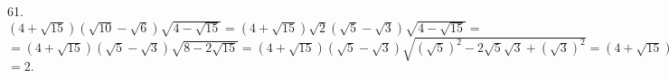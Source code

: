61. $(4+\sqrt{15})(\sqrt{10}-\sqrt{6})\sqrt{4-\sqrt{15}}=(4+\sqrt{15})\sqrt{2}(\sqrt{5}-\sqrt{3})\sqrt{4-\sqrt{15}}=$\\$=
(4+\sqrt{15})(\sqrt{5}-\sqrt{3})\sqrt{8-2\sqrt{15}}=(4+\sqrt{15})(\sqrt{5}-\sqrt{3})\sqrt{(\sqrt{5})^2-2\sqrt{5}\sqrt{3}+(\sqrt{3})^2}=
(4+\sqrt{15})(\sqrt{5}-\sqrt{3})\sqrt{(\sqrt{5}-\sqrt{3})^2}=(4+\sqrt{15})(\sqrt{5}-\sqrt{3})^2=
(4+\sqrt{15})(5-2\sqrt{15}+3)=(4+\sqrt{15})2(4-\sqrt{15})=2(16-15)=$\\$=2.$\\
